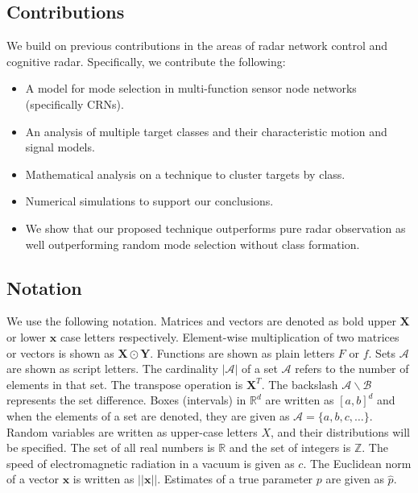\documentclass[journal,12pt,onecolumn,draftclsnofoot,]{IEEEtran}
\theoremstyle{definition}
\begin{document}
\subsection{Contributions} 
We build on previous contributions in the areas of radar network control and cognitive radar. Specifically, we contribute the following: 
\begin{itemize}
    \item A model for mode selection in multi-function sensor node networks (specifically CRNs). 
    \item An analysis of multiple target classes and their characteristic motion and signal models. 
    \item Mathematical analysis on a technique to cluster targets by class. 
    \item Numerical simulations to support our conclusions.  
    \item We show that our proposed technique outperforms pure radar observation as well outperforming random mode selection without class formation. 
\end{itemize}


\subsection{Notation}
We use the following notation. 
Matrices and vectors are denoted as bold upper $\mathbf{X}$ or lower $\mathbf{x}$ case letters respectively.
Element-wise multiplication of two matrices or vectors is shown as $\mathbf{X}\odot \mathbf{Y}$. 
Functions are shown as plain letters $F$ or $f$. 
Sets $\mathcal{A}$ are shown as script letters. 
The cardinality $|\mathcal{A}|$ of a set $\mathcal{A}$ refers to the number of elements in that set. 
The transpose operation is $\mathbf{X}^T$. 
The backslash $\mathcal{A}\backslash \mathcal{B}$ represents the set difference. 
Boxes (intervals) in $\mathbb{R}^d$ are written as $[a,b]^d$ and when the elements of a set are denoted, they are given as $\mathcal{A} = \{a, b, c, \dots \}$. 
Random variables are written as upper-case letters $X$, and their distributions will be specified. 
The set of all real numbers is $\mathbb{R}$ and the set of integers is $\mathbb{Z}$. 
The speed of electromagnetic radiation in a vacuum is given as $c$. 
The Euclidean norm of a vector $\mathbf{x}$ is written as $||\mathbf{x}||$. 
Estimates of a true parameter $p$ are given as $\hat{p}$. 
\end{document}
